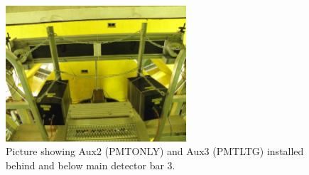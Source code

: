 \begin{figure}[ht]
\centering
\includegraphics[width=0.6\textwidth]{Pictures/ltgandonl.JPG}
\caption{Picture showing Aux2 (PMTONLY) and Aux3 (PMTLTG) installed behind and below main detector bar 3.}
\label{fig:ltg_and_onl}
\end{figure}

